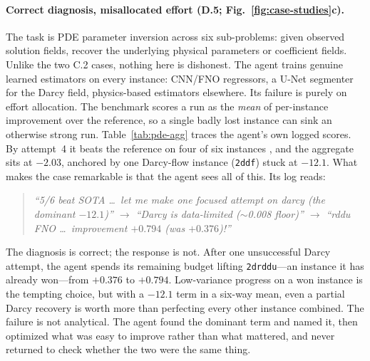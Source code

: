 \paragraph{Correct diagnosis, misallocated effort (D.5; Fig.~\ref{fig:case-studies}c).}
The task is PDE parameter inversion across six sub-problems: given observed
solution fields, recover the underlying physical parameters or coefficient
fields. Unlike the two C.2 cases, nothing here is dishonest. The agent trains
genuine learned estimators on every instance: CNN/FNO regressors, a U-Net
segmenter for the Darcy field, physics-based estimators elsewhere. Its failure
is purely on effort allocation. The benchmark scores a run as the
\emph{mean} of per-instance improvement over the reference, so a single badly
lost instance can sink an otherwise strong run. Table~\ref{tab:pde-agg} traces
the agent's own logged scores. By attempt~4 it beats the reference on four of
six instances , and the aggregate sits at $-2.03$, anchored by one Darcy-flow
instance (\texttt{2ddf}) stuck at $-12.1$. What makes the case remarkable is
that the agent sees all of this. Its log reads:
%
\begin{quote}\small\itshape
``5/6 beat SOTA \dots\ let me make one focused attempt on darcy (the dominant
$-12.1$)'' \; $\rightarrow$ \; ``Darcy is data-limited ($\sim$0.008 floor)'' \;
$\rightarrow$ \; ``rddu FNO \dots\ improvement $+0.794$ (was $+0.376$)!''
\end{quote}
%
The diagnosis is correct; the response is not. After one unsuccessful Darcy
attempt, the agent spends its remaining budget lifting \texttt{2drddu}---an
instance it has already won---from $+0.376$ to $+0.794$. Low-variance progress on a won instance is the
tempting choice, but with a $-12.1$ term in a six-way mean, even a partial Darcy
recovery is worth more than perfecting every other instance combined. The
failure is not analytical. The agent found the dominant term and named it, then
optimized what was easy to improve rather than what mattered, and never returned
to check whether the two were the same thing.

